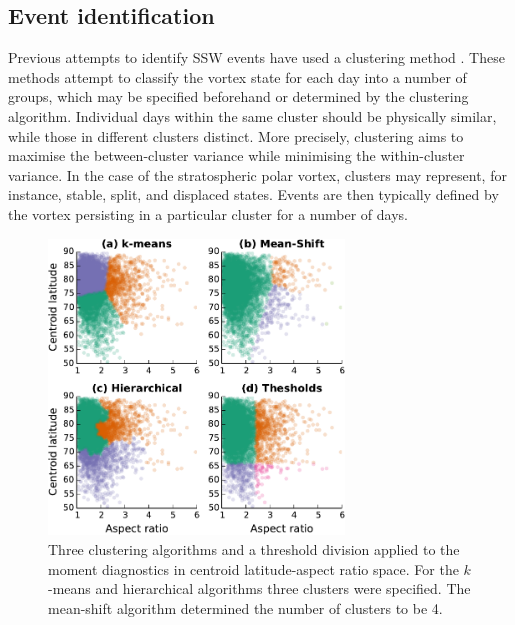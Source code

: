 \subsection{Event identification}
\label{sec:event-definition}

Previous attempts to identify SSW events have used a clustering method
\citep{K.Coughlin2009,Hannachi2010}. These methods attempt to classify the
vortex state for each day into a number of groups, which may be specified
beforehand or determined by the clustering algorithm. Individual days within the
same cluster should be physically similar, while those in different clusters
distinct. More precisely, clustering aims to maximise the between-cluster
variance while minimising the within-cluster variance. In the case of the
stratospheric polar vortex, clusters may represent, for instance, stable, split,
and displaced states. Events are then typically defined by the vortex persisting
in a particular cluster for a number of days.

\begin{figure}
 \centering
 \noindent\includegraphics[width=0.7\textwidth]{figures/chapter-moments/clustering.pdf}
 \caption[Clustering algorithms applied to the moment diagnostics.]{Three
   clustering algorithms and a threshold division applied to the moment
   diagnostics in centroid latitude-aspect ratio space. For the $k$-means and
   hierarchical algorithms three clusters were specified. The mean-shift
   algorithm determined the number of clusters to be 4.}
 \label{fig:clusters}
\end{figure}

